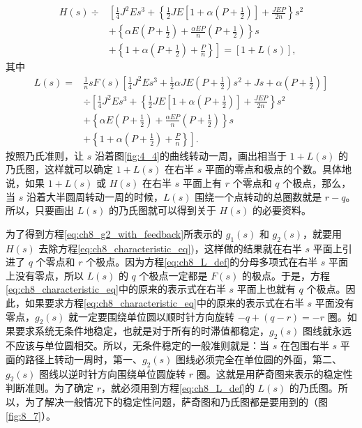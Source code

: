 \begin{equation}\label{eq:ch8_H_ratio}
\begin{aligned}
H(s) \div &\left[ \frac{1}{4} J^2 E s^3 + \left\{ \frac{1}{2} J E \left[ 1 + \alpha \left( P + \frac{1}{2} \right) \right] + \frac{JEP}{2n} \right\} s^2 \right. \\
&+ \left\{ \alpha E \left( P + \frac{1}{2} \right) + \frac{\alpha EP}{n} \left( P + \frac{1}{2} \right) \right\} s \\
&+ \left. \left\{ 1 + \alpha \left( P + \frac{1}{2} \right) + \frac{P}{n} \right\} \right] =\left[ 1 + L(s) \right],
\end{aligned}
\end{equation}
其中
\begin{equation}\label{eq:ch8_L_def}
\begin{aligned}
L(s) = &\frac{1}{n} s F(s) \left[ \frac{1}{4} J^2 E s^3 + \frac{1}{2} \alpha J E \left( P + \frac{1}{2} \right) s^2 + Js + \alpha \left( P + \frac{1}{2} \right) \right] \\
&\div \left[ \frac{1}{4} J^2 E s^3 + \left\{ \frac{1}{2} J E \left[ 1 + \alpha \left( P + \frac{1}{2} \right) \right] + \frac{JEP}{2n} \right\} s^2 \right. \\
&+ \left\{ \alpha E \left( P + \frac{1}{2} \right) + \frac{\alpha EP}{n} \left( P + \frac{1}{2} \right) \right\} s \\
&+ \left. \left\{ 1 + \alpha \left( P + \frac{1}{2} \right) + \frac{P}{n} \right\} \right].
\end{aligned}
\end{equation}
按照乃氏准则，让 $ s $ 沿着图\ref{fig:4_4}的曲线转动一周，画出相当于 $ 1 + L(s) $ 的乃氏图，这样就可以确定 $ 1 + L(s) $ 在右半 $ s $ 平面的零点和极点的个数。具体地说，如果 $ 1 + L(s) $ 或 $ H(s) $ 在右半 $ s $ 平面上有 $ r $ 个零点和 $ q $ 个极点，那么，当 $ s $ 沿着大半圆周转动一周的时候，$ L(s) $ 围绕一个点转动的总圈数就是 $ r - q $。所以，只要画出 $ L(s) $ 的乃氏图就可以得到关于 $ H(s) $ 的必要资料。

为了得到方程\eqref{eq:ch8_g2_with_feedback}所表示的 $ g_1(s) $ 和 $ g_2(s) $，就要用 $ H(s) $ 去除方程\eqref{eq:ch8_characteristic_eq})，这样做的结果就在右半 $ s $ 平面上引进了 $ q $ 个零点和 $ r $ 个极点。因为方程\eqref{eq:ch8_L_def}的分母多项式在右半 $ s $ 平面上没有零点，所以 $ L(s) $ 的 $ q $ 个极点一定都是 $ F(s) $ 的极点。于是，方程\eqref{eq:ch8_characteristic_eq}中的原来的表示式在右半 $ s $ 平面上也就有 $ q $ 个极点。因此，如果要求方程\eqref{eq:ch8_characteristic_eq}中的原来的表示式在右半 $ s $ 平面没有零点，$ g_2(s) $ 就一定要围绕单位圆以顺时针方向旋转 $ -q + (q - r) = -r $ 圈。如果要求系统无条件地稳定，也就是对于所有的时滞值都稳定，$ g_2(s) $ 图线就永远不应该与单位圆相交。所以，无条件稳定的一般准则就是：当 $ s $ 在包围右半 $ s $ 平面的路径上转动一周时，第一、$ g_2(s) $ 图线必须完全在单位圆的外面，第二、$ g_2(s) $ 图线以逆时针方向围绕单位圆旋转 $ r $ 圈。这就是用萨奇图来表示的稳定性判断准则。为了确定 $ r $，就必须用到方程\eqref{eq:ch8_L_def}的 $ L(s) $ 的乃氏图。所以，为了解决一般情况下的稳定性问题，萨奇图和乃氏图都是要用到的（图\ref{fig:8_7}）。

